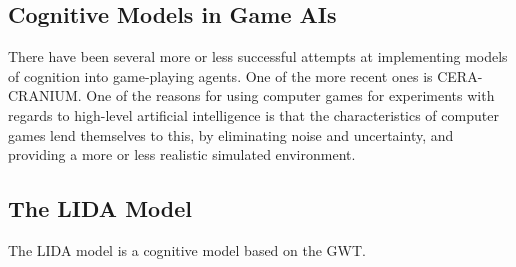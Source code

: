 \subsection{Cognitive Models in Game AIs}
There have been several more or less successful attempts at implementing models
of cognition into game-playing agents. One of the more recent ones is
CERA-CRANIUM. One of the reasons for using computer games for experiments with regards to
high-level artificial intelligence is that the characteristics of computer
games lend themselves to this, by eliminating noise and uncertainty, and
providing a more or less realistic simulated environment.

\subsection{The LIDA Model}
The LIDA model is a cognitive model based on the GWT.